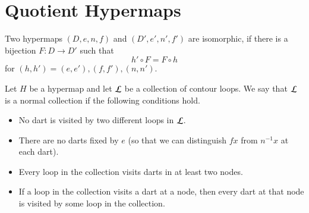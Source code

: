 %
%
%
%
%
%




\section{Quotient Hypermaps}


\begin{definition} Two hypermaps $(D,e,n,f)$ and $(D',e',n',f')$ are
isomorphic, if there is a bijection $F:D\to D'$ such that
    $$h'\circ F = F\circ h$$
for $(h,h')=(e,e'), (f,f'), (n,n')$.
\end{definition}


\begin{definition}
Let $H$ be a hypermap and let $\cal L$ be a collection of contour
loops.  We say that $\cal L$ is a normal collection if the following
conditions hold. \begin{itemize}
 \item No dart is visited by two different loops in $\cal
L$.
 \item There are no darts fixed by $e$ (so that we can distinguish $f x$
from $n^{-1} x$ at each dart).
 \item Every loop in the
collection visits darts in at least two nodes.
 \item If a loop in the
 collection visits a dart at a node, then every dart at that node is
 visited by some loop in the collection.
\end{itemize}
\end{definition}

